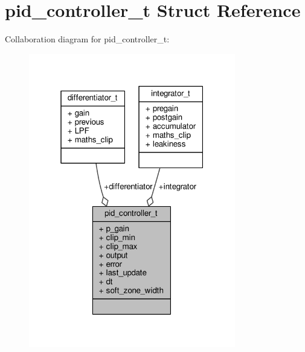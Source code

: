 \hypertarget{structpid__controller__t}{\section{pid\+\_\+controller\+\_\+t Struct Reference}
\label{structpid__controller__t}
}


Collaboration diagram for pid\+\_\+controller\+\_\+t\+:
\nopagebreak
\begin{figure}[H]
\begin{center}
\leavevmode
\includegraphics[width=256pt]{structpid__controller__t__coll__graph}
\end{center}
\end{figure}
